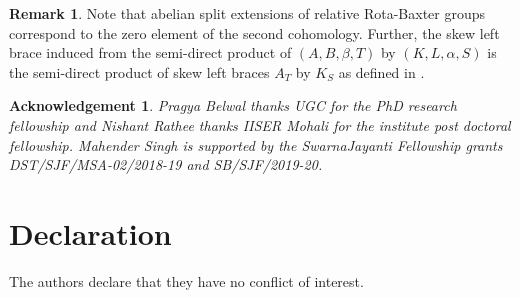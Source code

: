 \documentclass[11pt]{amsart}
\theoremstyle{thrm}
\theoremstyle{plain}
\newtheorem*{ack}{Acknowledgement}
\theoremstyle{definition}
\newtheorem{remark}[equation]{Remark}
\numberwithin{equation}{section}
\begin{document}
\begin{remark}
Note that abelian split extensions of relative Rota-Baxter groups correspond to the zero element of the second cohomology. Further, the skew left brace induced from the semi-direct product  of $(A, B, \beta, T)$ by  $(K, L, \alpha, S)$ is the semi-direct product of skew left braces $A_{T}$ by $K_{S}$ as defined in \cite{N1}. 
\end{remark}
\medskip
 	
\begin{ack}
{\rm Pragya Belwal thanks UGC for the PhD research fellowship and Nishant Rathee thanks IISER Mohali for the institute post doctoral fellowship. Mahender Singh is supported by the SwarnaJayanti Fellowship grants DST/SJF/MSA-02/2018-19 and SB/SJF/2019-20.}
\end{ack}

\section{Declaration}
The authors declare that they have no conflict of interest.
\medskip
\end{document}
